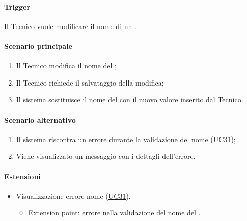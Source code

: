 \paragraph*{Trigger}
Il Tecnico vuole modificare il nome di un .

\paragraph*{Scenario principale}
\begin{enumerate};
  \item Il Tecnico modifica il nome del ;
  \item Il Tecnico richiede il salvataggio della modifica;
  \item Il sistema sostituisce il nome del  con il nuovo valore inserito dal Tecnico.
\end{enumerate}

\paragraph*{Scenario alternativo}
\begin{enumerate}
  \item Il sistema riscontra un errore durante la validazione del nome (\hyperref[UC31]{UC31});
  \item Viene visualizzato un messaggio con i dettagli dell'errore.
\end{enumerate}

\paragraph*{Estensioni}
\begin{itemize}
  \item Visualizzazione errore nome  (\hyperref[UC31]{UC31}).
  \begin{itemize}
    \item Extension point: errore nella validazione del nome del .
  \end{itemize}
\end{itemize}